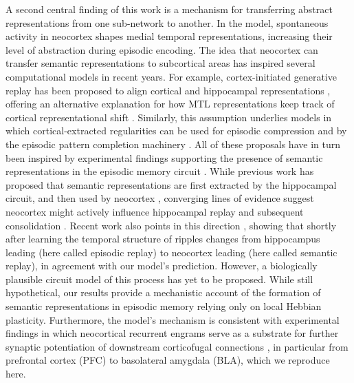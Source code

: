 \documentclass{article}
\begin{document}
\newline\newline
A second central finding of this work is a mechanism for transferring abstract representations from one sub-network to another. In the model, spontaneous activity in neocortex shapes medial temporal representations, increasing their level of abstraction during episodic encoding. The idea that neocortex can transfer semantic representations to subcortical areas has inspired several computational models in recent years. For example, cortex-initiated generative replay has been proposed to align cortical and hippocampal representations , offering an alternative explanation for how MTL representations keep track of cortical representational shift . Similarly, this assumption underlies models in which cortical-extracted regularities can be used for episodic compression  and by the episodic pattern completion machinery . All of these proposals have in turn been inspired by experimental findings supporting the presence of semantic representations in the episodic memory circuit . While previous work has proposed that semantic representations are first extracted by the hippocampal circuit, and then used by neocortex , converging lines of evidence suggest neocortex might actively influence hippocampal replay and subsequent consolidation . Recent work also points in this direction , showing that shortly after learning the temporal structure of ripples changes from hippocampus leading (here called episodic replay) to neocortex leading (here called semantic replay), in agreement with our model's prediction. However, a biologically plausible circuit model of this process has yet to be proposed. While still hypothetical, our results provide a mechanistic account of the formation of semantic representations in episodic memory relying only on local Hebbian plasticity. Furthermore, the model's mechanism is consistent with experimental findings in which neocortical recurrent engrams serve as a substrate for further synaptic potentiation of downstream corticofugal connections , in particular from prefrontal cortex (PFC) to basolateral amygdala (BLA), which we reproduce here.
\newline\newline
\end{document}
